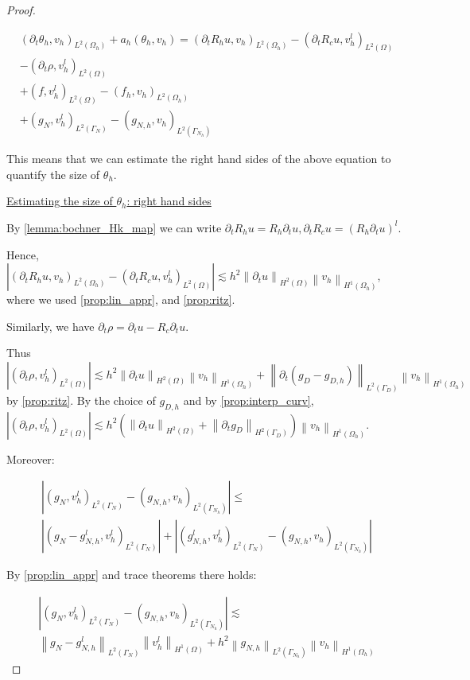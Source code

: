 \documentclass[english,a4paper,9pt,oneside]{scrbook}	%
\theoremstyle{break}
\newenvironment{mproof}[1][\proofname]{%
  \begin{proof}[#1]$ $\par\nobreak\ignorespaces
}{%
  \end{proof}
}
\renewcommand*{\proofname}{Proof}
\theoremstyle{remark}
\newcommand{\norm}[1]{\left\lVert#1\right\rVert}
\begin{document}
\begin{appendices}
\begin{mproof}
\begin{align}
\label{eqn:theta}
(\partial_t \theta_h , v_h)_{L^2(\Omega_h)} + a_h(\theta_h, v_h) = 
(\partial_t R_h u , v_h)_{L^2(\Omega_h)} - (\partial_t R_c u , v_h^l)_{L^2(\Omega)}\\
- (\partial_t \rho, v_h^l)_{L^2(\Omega)}\\ + (f, v_h^l)_{L^2(\Omega)} - (f_h, v_h)_{L^2(\Omega_h)}\\ + (g_{N}, v_h^l)_{L^2(\Gamma_{N})} - (g_{N,h}, v_h)_{L^2(\Gamma_{N_h})} 
\end{align}

This means that we can estimate the right hand sides of the above equation to quantify the size of $\theta_h$.

\underline{Estimating the size of $\theta_h$: right hand sides}

By \cref{lemma:bochner_Hk_map} we can write $\partial_t R_h u = R_h \partial_t u, \partial_t R_c u = (R_h \partial_t u)^l$.

Hence, $|(\partial_t R_h u , v_h)_{L^2(\Omega_h)} - (\partial_t R_c u , v_h^l)_{L^2(\Omega)}|\lesssim h^2 \norm{\partial_t u}_{H^2(\Omega)}\norm{v_h}_{H^1(\Omega_h)}$, where we used \cref{prop:lin_appr}, and \cref{prop:ritz}.

Similarly, we have $\partial_t \rho = \partial_t u - R_c\partial_t u$.

Thus $| (\partial_t \rho, v_h^l)_{L^2(\Omega)}|\lesssim h^2 \norm{\partial_t u}_{H^2(\Omega)}\norm{v_h}_{H^1(\Omega_h)} + \norm{\partial_t(g_D - g_{D,h}) }_{L^2(\Gamma_D)}\norm{v_h}_{H^1(\Omega_h)}$ by \cref{prop:ritz}. By the choice of $g_{D,h}$ and by \cref{prop:interp_curv}, $| (\partial_t \rho, v_h^l)_{L^2(\Omega)}|\lesssim h^2 (\norm{\partial_t u}_{H^2(\Omega)} + \norm{\partial_t g_D}_{H^2(\Gamma_D)})\norm{v_h}_{H^1(\Omega_h)}$.

Moreover:

\begin{align*}
	|(g_{N}, v_h^l)_{L^2(\Gamma_{N})} - (g_{N,h}, v_h)_{L^2(\Gamma_{N_h})} |\leq\\
	|(g_{N} - g_{N,h}^l, v_h^l)_{L^2(\Gamma_{N})}| + |(g_{N,h}^l, v_h^l)_{L^2(\Gamma_{N})} - (g_{N,h}, v_h)_{L^2(\Gamma_{N_h})} |
\end{align*}

By \cref{prop:lin_appr} and trace theorems there holds:


\begin{align*}
	|(g_{N}, v_h^l)_{L^2(\Gamma_{N})} - (g_{N,h}, v_h)_{L^2(\Gamma_{N_h})} |\lesssim\\
	\norm{g_{N} - g_{N,h}^l}_{L^2(\Gamma_{N})}\norm{v_h^l}_{H^1(\Omega)} + h^2\norm{g_{N,h}}_{L^2(\Gamma_{N_h})} \norm{v_h}_{H^1(\Omega_h )}
\end{align*}


\end{mproof}
\end{appendices}
\end{document}
